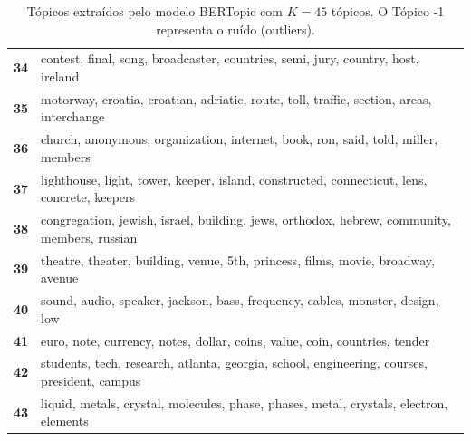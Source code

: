 \begin{table}[htpb]
\begin{tabularx}{\textwidth}{@{}l X@{}}
        \textbf{34} & contest, final, song, broadcaster, countries, semi, jury, country, host, ireland \\
        \textbf{35} & motorway, croatia, croatian, adriatic, route, toll, traffic, section, areas, interchange \\
        \textbf{36} & church, anonymous, organization, internet, book, ron, said, told, miller, members \\
        \textbf{37} & lighthouse, light, tower, keeper, island, constructed, connecticut, lens, concrete, keepers \\
        \textbf{38} & congregation, jewish, israel, building, jews, orthodox, hebrew, community, members, russian \\
        \textbf{39} & theatre, theater, building, venue, 5th, princess, films, movie, broadway, avenue \\
        \textbf{40} & sound, audio, speaker, jackson, bass, frequency, cables, monster, design, low \\
        \textbf{41} & euro, note, currency, notes, dollar, coins, value, coin, countries, tender \\
        \textbf{42} & students, tech, research, atlanta, georgia, school, engineering, courses, president, campus \\
        \textbf{43} & liquid, metals, crystal, molecules, phase, phases, metal, crystals, electron, elements \\
        \bottomrule
    \end{tabularx}
    \caption{Tópicos extraídos pelo modelo BERTopic com $K=45$ tópicos. O Tópico -1 representa o ruído (outliers).}
    \label{tab:topicos_bertopic_45}
\end{table}
